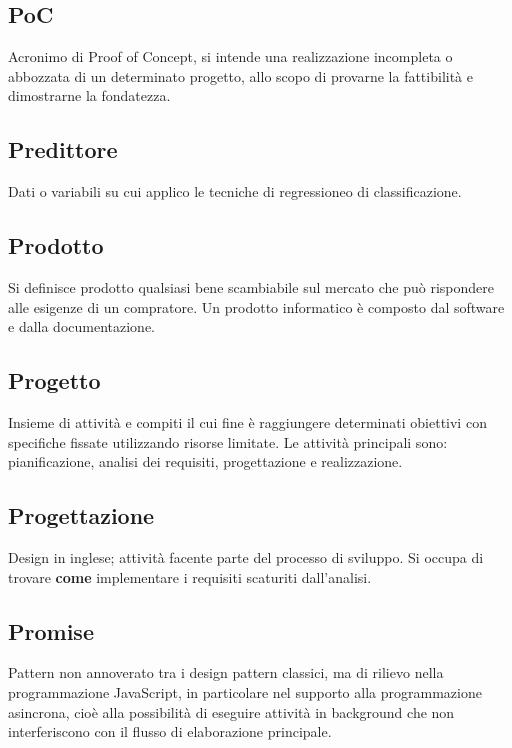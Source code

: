 \subsection*{PoC}
Acronimo di Proof of Concept, si intende una realizzazione incompleta o abbozzata di un determinato progetto, allo scopo di provarne la fattibilità e dimostrarne la fondatezza.


\subsection*{Predittore}
Dati o variabili su cui applico le tecniche di regressione\glosp o di classificazione\glo.

\subsection*{Prodotto}
Si definisce prodotto qualsiasi bene scambiabile sul mercato che può rispondere alle esigenze di un compratore. Un prodotto informatico è composto dal software e dalla documentazione.

\subsection*{Progetto}
Insieme di attività e compiti il cui fine è raggiungere determinati obiettivi con specifiche fissate utilizzando risorse limitate. Le attività principali sono: pianificazione, analisi dei requisiti, progettazione e realizzazione.

\subsection*{Progettazione}
Design in inglese; attività facente parte del processo di sviluppo. Si occupa di trovare \textbf{come} implementare i requisiti scaturiti dall'analisi.

\subsection*{Promise}
Pattern non annoverato tra i design pattern classici, ma di rilievo nella programmazione JavaScript, in particolare nel supporto alla programmazione asincrona, cioè alla possibilità di eseguire attività in background che non interferiscono con il flusso di elaborazione principale. 

